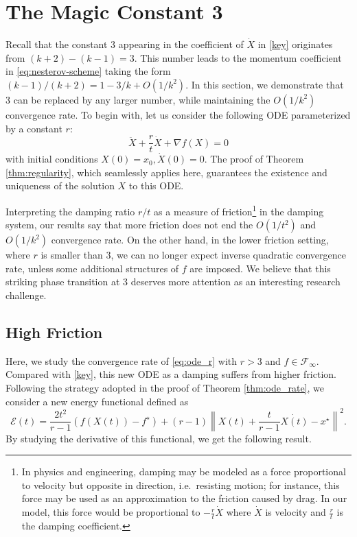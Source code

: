 \documentclass[twoside,11pt]{article}
\begin{document}
\section{The Magic Constant 3}
\label{sec:varycoeff}
Recall that the constant 3 appearing in the coefficient of $\dot X$ in \eqref{key} originates from $(k+2) - (k-1) = 3$. This number leads to the momentum coefficient in \eqref{eq:nesterov-scheme} taking the form $(k-1)/(k+2) = 1 - 3/k + O(1/k^2)$. In this section, we demonstrate that 3 can be replaced by any larger number, while maintaining the $O(1/k^2)$ convergence rate. To begin with, let us consider the following ODE parameterized by a constant $r$:
\begin{equation}\label{eq:ode_r}
\ddot{X} + \frac{r}{t}\dot{X} + \nabla f(X) = 0
\end{equation}
with initial conditions $X(0) = x_0, \dot X(0) = 0$. The proof of Theorem \ref{thm:regularity}, which seamlessly applies here, guarantees the existence and uniqueness of the solution $X$ to this ODE. 

Interpreting the damping ratio $r/t$ as a measure of
friction\footnote{In physics and engineering, damping may be modeled
  as a force proportional to velocity but opposite in direction,
  i.e.~resisting motion; for instance, this force may be used as an
  approximation to the friction caused by drag. In our model, this
  force would be proportional to $-\frac{r}{t} \dot{X}$ where
  $\dot{X}$ is velocity and $\frac{r}{t}$ is the damping coefficient.}
in the damping system, our results say that more friction does not end
the $O(1/t^2)$ and $O(1/k^2)$ convergence rate.  On the other hand, in
the lower friction setting, where $r$ is smaller than 3, we can no
longer expect inverse quadratic convergence rate, unless some
additional structures of $f$ are imposed. We believe that this
striking phase transition at 3 deserves more attention as an
interesting research challenge.


\subsection{High Friction}
\label{sec:high-friction}
Here, we study the convergence rate of \eqref{eq:ode_r} with $r > 3$ and $f \in \mathcal{F}_{\infty}$. Compared with \eqref{key}, this new ODE as a damping suffers from higher friction. Following the strategy adopted in the proof of Theorem \ref{thm:ode_rate}, we consider a new energy functional defined as
\begin{equation}\nonumber
\mathcal{E}(t) = \frac{2t^2}{r-1}(f(X(t)) - f^\star) + (r-1)\left\|X(t) + \frac{t}{r-1}\dot{X(t)} - x^\star\right\|^2.
\end{equation}
By studying the derivative of this functional, we get the following result.
\end{document}
